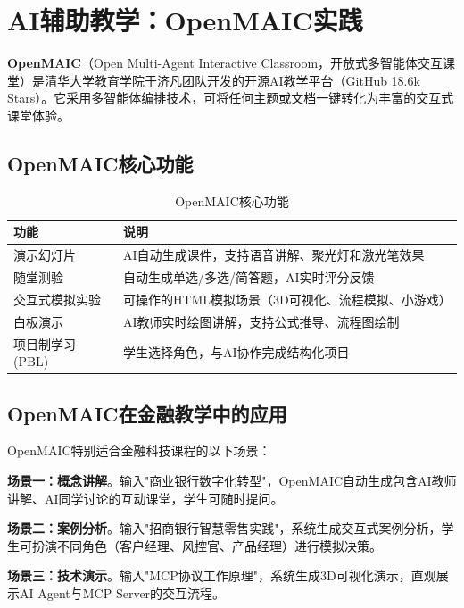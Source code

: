 \section{AI辅助教学：OpenMAIC实践}

\begin{theorybox}[清华大学OpenMAIC项目]
\textbf{OpenMAIC}（Open Multi-Agent Interactive Classroom，开放式多智能体交互课堂）是清华大学教育学院于济凡团队开发的开源AI教学平台（GitHub 18.6k Stars）。它采用多智能体编排技术，可将任何主题或文档一键转化为丰富的交互式课堂体验。
\end{theorybox}

\subsection{OpenMAIC核心功能}

\begin{table}[H]
\centering
\begin{tabular}{lp{8cm}}
\toprule
\textbf{功能} & \textbf{说明} \\
\midrule
演示幻灯片 & AI自动生成课件，支持语音讲解、聚光灯和激光笔效果 \\
随堂测验 & 自动生成单选/多选/简答题，AI实时评分反馈 \\
交互式模拟实验 & 可操作的HTML模拟场景（3D可视化、流程模拟、小游戏） \\
白板演示 & AI教师实时绘图讲解，支持公式推导、流程图绘制 \\
项目制学习(PBL) & 学生选择角色，与AI协作完成结构化项目 \\
\bottomrule
\end{tabular}
\caption{OpenMAIC核心功能}
\end{table}

\subsection{OpenMAIC在金融教学中的应用}

OpenMAIC特别适合金融科技课程的以下场景：

\textbf{场景一：概念讲解}。输入"商业银行数字化转型"，OpenMAIC自动生成包含AI教师讲解、AI同学讨论的互动课堂，学生可随时提问。

\textbf{场景二：案例分析}。输入"招商银行智慧零售实践"，系统生成交互式案例分析，学生可扮演不同角色（客户经理、风控官、产品经理）进行模拟决策。

\textbf{场景三：技术演示}。输入"MCP协议工作原理"，系统生成3D可视化演示，直观展示AI Agent与MCP Server的交互流程。

